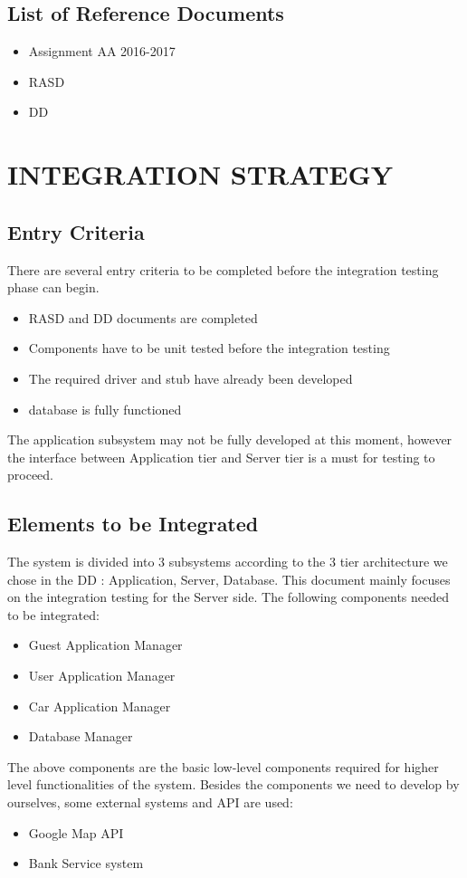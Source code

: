 \documentclass{article}
\begin{document}
 \subsection{List of Reference Documents}
	 \begin{itemize}
	 	\item Assignment AA 2016-2017
	 	\item RASD
	 	\item DD
	 \end{itemize}
\newpage

\section{INTEGRATION STRATEGY}
 \subsection{Entry Criteria}
 There are several entry criteria to be completed before the integration testing phase can begin. 
 \begin{itemize}
	 \item RASD and DD documents are completed
	 \item Components have to be unit tested before the integration testing
	 \item The required driver and stub have already been developed
	 \item database is fully functioned
\end{itemize}
The application subsystem may not be fully developed at this moment, however the interface between Application tier and Server tier is a must for testing to proceed.
 \subsection{Elements to be Integrated}
 The system is divided into 3 subsystems  according to the 3 tier architecture we chose in the DD : Application, Server, Database.
 This document mainly focuses on the integration testing for the Server side.
 The following components needed to be integrated:
 \begin{itemize}
 	\item Guest Application Manager
 	\item User Application Manager
 	\item Car Application Manager
 	\item Database Manager
 \end{itemize}
The above components are the basic low-level components required for higher level functionalities of the system. Besides the components we need to develop by ourselves, some external systems and API are used:
 \begin{itemize}
 	\item Google Map API
 	\item Bank Service system
 \end{itemize}
\end{document}
